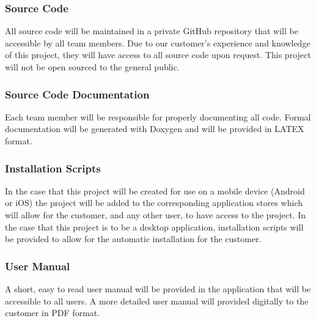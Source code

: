 \subsubsection{Source Code}
All source code will be maintained in a private GitHub repository that will be accessible by all team members. Due to our customer's experience and knowledge of this project, they will have access to all source code upon request. This project will not be open sourced to the general public.

\subsubsection{Source Code Documentation}
Each team member will be responsible for properly documenting all code. Formal documentation will be generated with Doxygen and will be provided in LATEX format.

\subsubsection{Installation Scripts}
In the case that this project will be created for use on a mobile device (Android or iOS) the project will be added to the corresponding application stores which will allow for the customer, and any other user, to have access to the project. In the case that this project is to be a desktop application, installation scripts will be provided to allow for the automatic installation for the customer.

\subsubsection{User Manual}
A short, easy to read user manual will be provided in the application that will be accessible to all users. A more detailed user manual will provided digitally to the customer in PDF format.
